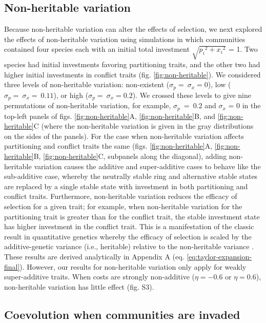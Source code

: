 \subsection*{Non-heritable variation}

Because non-heritable variation can alter the effects of selection, we next
explored the effects of non-heritable variation using simulations in
which communities contained four species each with an initial total
investment $\sqrt{{p_{i}}^{2} + {x_{i}}^{2}}$ = 1. Two species had
initial investments favoring partitioning traits, and the other two had
higher initial investments in conflict traits (fig. \ref{fig:non-heritable}). We considered
three levels of non-heritable variation: non-existent
($\sigma_{p} = \ \sigma_{x} = 0$), low
($\sigma_{p} = \ \sigma_{x} = \ 0.11$), or high
($\sigma_{p} = \ \sigma_{x} = 0.2$). We crossed these levels to give
nine permutations of non-heritable variation, for example,
$\sigma_{p}\  = \ 0.2$ and $\sigma_{x}$ = 0 in the top-left panels
of figs. \ref{fig:non-heritable}A, \ref{fig:non-heritable}B, and \ref{fig:non-heritable}C (where the non-heritable variation is given in the
gray distributions on the sides of the panels). For the case when
non-heritable variation affects partitioning and conflict traits the same
(figs. \ref{fig:non-heritable}A, \ref{fig:non-heritable}B, \ref{fig:non-heritable}C, subpanels along the diagonal),  adding non-heritable variation causes the additive and super-additive cases to behave like the sub-additive case, whereby the neutrally stable ring and alternative stable states are replaced by a single stable state with investment in both partitioning and conflict traits. Furthermore, non-heritable variation reduces the efficacy of selection for a given trait; for example, when non-heritable variation for the partitioning trait is greater than for the conflict trait, the stable investment state has higher investment in the conflict trait. This is a manifestation of the classic result in quantitative genetics whereby the efficacy of selection is scaled by the additive-genetic variance (i.e., heritable) relative to the non-heritable variance 
\citep{Fisher1930a, Wright1931b, Barton2017}.
These results are derived analytically
in Appendix A (eq. \ref{eq:taylor-expansion-final}).
However, our results for non-heritable variation only apply for 
weakly super-additive traits. When costs are
strongly non-additive ($\eta = - 0.6$ or $\eta = 0.6$), non-heritable
variation has little effect (fig. S3).

\subsection*{Coevolution when communities are invaded}

